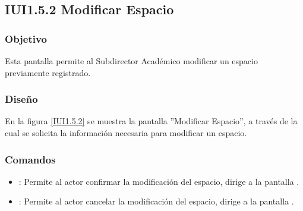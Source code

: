 \subsection{IUI1.5.2 Modificar Espacio}

\subsubsection{Objetivo}
	Esta pantalla permite al Subdirector Académico modificar un espacio previamente registrado.

\subsubsection{Diseño}

	En la figura \ref{IUI1.5.2} se muestra la pantalla ''Modificar Espacio'', a través de la cual se solicita la información necesaria para modificar un espacio.


\subsubsection{Comandos}
\begin{itemize}
	\item {}: Permite al actor confirmar la modificación del espacio, dirige a la pantalla .
	
	\item {}: Permite al actor cancelar la modificación del espacio, dirige a la pantalla .
\end{itemize}

